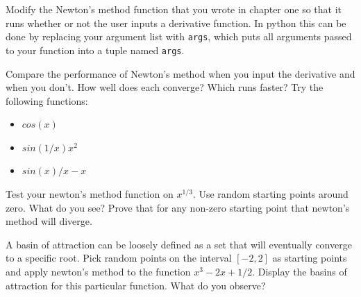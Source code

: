\begin{problem}
Modify the Newton's method function that you wrote in chapter one so that it runs whether or not the user inputs a derivative function. In python this can be done by replacing your argument list with {\tt *args}, which puts all arguments passed to your function into a tuple named {\tt args}.

Compare the performance of Newton's method when you input the derivative and when you don't. How well does each converge? Which runs faster? Try the following functions:

\begin{itemize}
\item $cos(x)$
\item $sin(1/x)x^2$
\item $sin(x)/x -x$
\end{itemize}


\end{problem}

\begin{problem}
Test your newton's method function on $x^{1/3}$. Use random starting points around zero. What do you see? Prove that for any non-zero starting point that newton's method will diverge.
\end{problem}

\begin{problem}
A basin of attraction can be loosely defined as a set that will eventually converge to a specific root. Pick random points on the interval $[-2,2]$ as starting points and apply newton's method to the function $x^3 -2x + 1/2$. Display the basins of attraction for this particular function. What do you observe?


\end{problem}


